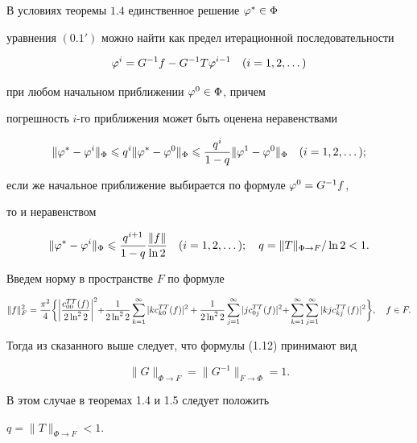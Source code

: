 \begin{thms}


В условиях теоремы $1.4$ единственное решение $\varphi^*\in \Phi$


уравнения $(0.1')$ можно найти как предел итерационной последовательности 


$$


\vp^i = G^{-1}f - G^{-1}T\vp^{i-1}\quad (i=1,2,\dotsc)


$$


при любом начальном приближении $\varphi^0\in \Phi$, причем 


погрешность $i$-го приближения может быть оценена неравенствами 


$$


\|\vp^*-\vp^i\|_{\Phi}\lea q^i\|\vp^*-\vp^0\|_\Phi \lea


\frac{q^i}{1-q}\|\vp^1 - \vp^0\|_{\Phi}\quad (i=1,2,\dotsc);


$$


если же начальное приближение выбирается по формуле $\varphi^0 = G^{-1}f$, 


то и неравенством


$$


\|\vp^* - \vp^i\|_\Phi \lea \frac{q^{i+1}}{1-q}


\frac{\|f\|}{\ln 2}\quad (i=1,2,\dotsc);\quad


q=\|T\|_{\Phi\to F}/\ln 2<1.


$$


\end{thms}





\begin{notes}


Введем норму в пространстве $F$ по формуле


$$




\|f\|_F^2 = \frac{\pi^2}{4}\bigg\{\bigg|\frac{c_{00}^{TT}(f)}{2\ln^2 2}


\bigg|^2 {+} \frac{1}{2\ln^2 2}\suml_{k=1}^\infty|k c_{k0}^{TT}(f)|^2+


%


\frac{1}{2\ln^2 2}\suml_{j=1}^\infty |j c_{0j}^{TT}(f)|^2 {+}


\suml_{k=1}^\infty\suml_{j=1}^\infty


|kj c_{kj}^{TT}(f)|^2\bigg\},\quad f\in F.




$$


Тогда из сказанного выше следует, что формулы (1.12) принимают вид


$$


\|G\|_{\Phi\to F} = \|G^{-1}\|_{F\to \Phi} = 1.


$$


В этом случае в теоремах 1.4 и 1.5 следует положить 


$q = \|T\|_{\Phi\to F}<1.$


\end{notes}








